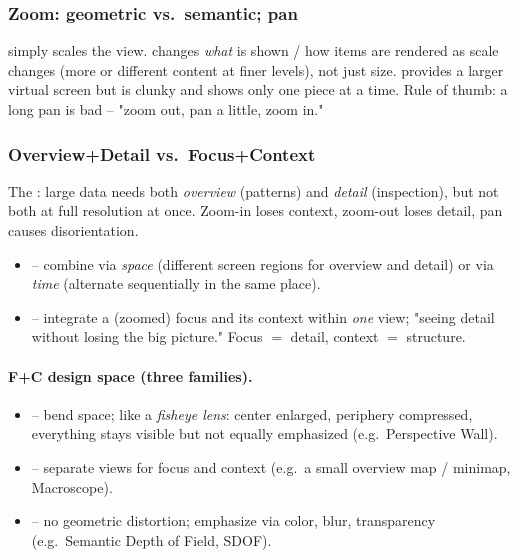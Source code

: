 \subsubsection{Zoom: geometric vs.\ semantic; pan}
 simply scales the view.  changes \emph{what} is shown / how items are rendered as scale changes (more or different content at finer levels), not just size.  provides a larger virtual screen but is clunky and shows only one piece at a time. Rule of thumb: a long pan is bad -- "zoom out, pan a little, zoom in."

\subsubsection{Overview+Detail vs.\ Focus+Context}
The : large data needs both \emph{overview} (patterns) and \emph{detail} (inspection), but not both at full resolution at once. Zoom-in loses context, zoom-out loses detail, pan causes disorientation.
\begin{itemize}
  \item {} -- combine via \emph{space} (different screen regions for overview and detail) or via \emph{time} (alternate sequentially in the same place).
  \item {} -- integrate a (zoomed) focus and its context within \emph{one} view; "seeing detail without losing the big picture." Focus $=$ detail, context $=$ structure.
\end{itemize}

\paragraph{F+C design space (three families).}
\begin{itemize}
  \item {} -- bend space; like a \emph{fisheye lens}: center enlarged, periphery compressed, everything stays visible but not equally emphasized (e.g.\ Perspective Wall).
  \item {} -- separate views for focus and context (e.g.\ a small overview map / minimap, Macroscope).
  \item {} -- no geometric distortion; emphasize via color, blur, transparency (e.g.\ Semantic Depth of Field, SDOF).
\end{itemize}

